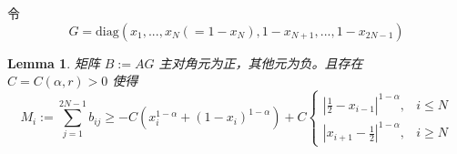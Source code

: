 \documentclass{ctexart}
\newtheorem{lemma}[theorem]{Lemma}
\theoremstyle{definition}
\theoremstyle{remark}
\numberwithin{equation}{section}
\begin{document}
令
\begin{equation}
    G = \text{diag}(x_1, ..., x_N(=1-x_N), 1-x_{N+1}, ... , 1-x_{2N-1})
\end{equation}

\begin{lemma}\label{lmm:AGhasSingularity}
    矩阵 \(B := AG\) 主对角元为正，其他元为负。且存在 \(C=C(\alpha,r)>0\) 使得
    \begin{equation}
        M_i := \sum_{j=1}^{2N-1} b_{ij}
        \ge -C(x_i^{1-\alpha} + (1-x_i)^{1-\alpha}) + C\begin{cases}
            |\frac{1}{2} - x_{i-1}|^{1-\alpha} , & i\le N \\
            |x_{i+1} - \frac{1}{2}|^{1-\alpha} , & i\ge N
        \end{cases}
    \end{equation}
\end{lemma}
\end{document}
